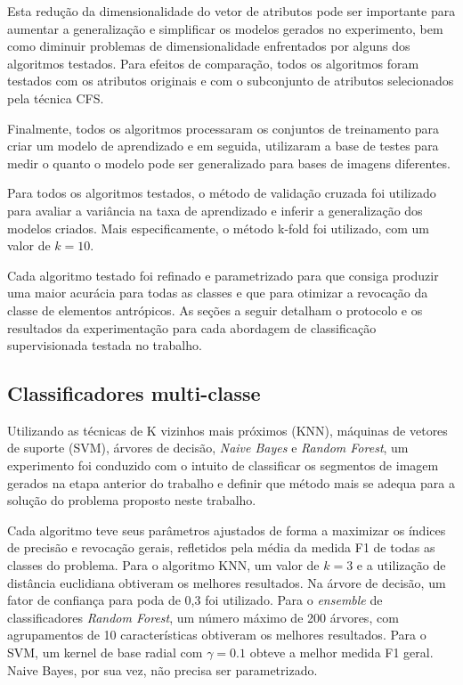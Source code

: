 Esta redução da dimensionalidade do vetor de atributos pode ser importante para aumentar a generalização e simplificar os modelos gerados no experimento, bem como diminuir problemas de dimensionalidade enfrentados por alguns dos algoritmos testados. Para efeitos de comparação, todos os algoritmos foram testados com os atributos originais e com o subconjunto de atributos selecionados pela técnica CFS.

Finalmente, todos os algoritmos processaram os conjuntos de treinamento para criar um modelo de aprendizado e em seguida, utilizaram a base de testes para medir o quanto o modelo pode ser generalizado para bases de imagens diferentes.

Para todos os algoritmos testados, o método de validação cruzada foi utilizado para avaliar a variância na taxa de aprendizado e inferir a generalização dos modelos criados. Mais especificamente, o método k-fold foi utilizado, com um valor de $k=10$.

Cada algoritmo testado foi refinado e parametrizado para que consiga produzir uma maior acurácia para todas as classes e que para otimizar a revocação da classe de elementos antrópicos. As seções a seguir detalham o protocolo e os resultados da experimentação para cada abordagem de classificação supervisionada testada no trabalho.

\subsection{Classificadores multi-classe}

Utilizando as técnicas de K vizinhos mais próximos (KNN), máquinas de vetores de suporte (SVM), árvores de decisão, \textit{Naive Bayes} e \textit{Random Forest}, um experimento foi conduzido com o intuito de classificar os segmentos de imagem gerados na etapa anterior do trabalho e definir que método mais se adequa para a solução do problema proposto neste trabalho.

Cada algoritmo teve seus parâmetros ajustados de forma a maximizar os índices de precisão e revocação gerais, refletidos pela média da medida F1 de todas as classes do problema. Para o algoritmo KNN, um valor de $k=3$ e a utilização de distância euclidiana obtiveram os melhores resultados. Na árvore de decisão, um fator de confiança para poda de 0,3 foi utilizado. Para o \textit{ensemble} de classificadores \textit{Random Forest}, um número máximo de 200 árvores, com agrupamentos de 10 características obtiveram os melhores resultados. Para o SVM, um kernel de base radial com $\gamma = 0.1$ obteve a melhor medida F1 geral. Naive Bayes, por sua vez, não precisa ser parametrizado.

